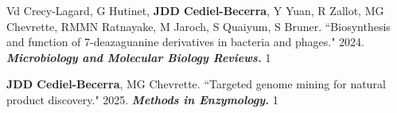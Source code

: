 
 \vspace{-2mm}

\begin{cvpubs}


\cvpub
{Vd Crecy-Lagard, G Hutinet, \textbf{JDD Cediel-Becerra}, Y Yuan, R Zallot, MG Chevrette, RMMN Ratnayake, M Jaroch, S Quaiyum, S Bruner. ``Biosynthesis and function of 7-deazaguanine derivatives in bacteria and phages." 2024. \textit{\textbf{Microbiology and Molecular Biology Reviews.}}\textit{\textbf{}}}
{1}

\end{cvpubs}



 \vspace{-2mm}

\begin{cvpubs}


\cvpub
{\textbf{JDD Cediel-Becerra}, MG Chevrette. ``Targeted genome mining for natural product discovery." 2025. \textit{\textbf{Methods in Enzymology.}} \textit{\textbf{}}}
{1}

\end{cvpubs}








